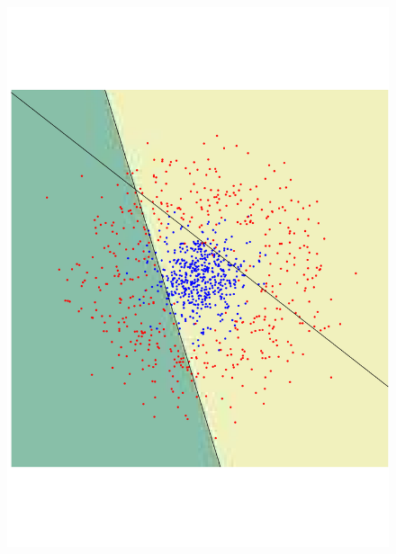 \begin{figure}
\begin{center}
 \includegraphics[angle=270, scale=0.166]{ch4/figures/79.pdf}\\

\end{center}
\end{figure}
